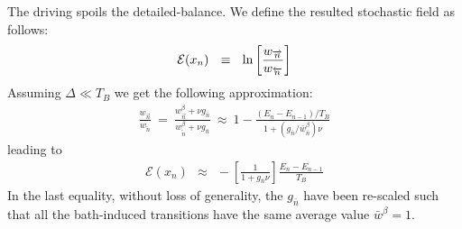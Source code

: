 \documentclass[aps,pre,floats,floatfix,twocolumn]{revtex4}
\newcommand{\mylabel}[1]{\label{#1}}
\newcommand{\beq}{\begin{eqnarray}}
\newcommand{\eeq}{\end{eqnarray}}
\newcommand{\be}[1]{\begin{eqnarray}\ifthenelse{#1=-1}
{\nonumber}{\ifthenelse{#1=0}{}{\mylabel{e#1}}}}
\begin{document}
The driving spoils the detailed-balance. 
We define the resulted stochastic field as follows:
%
\be{100} 
\mathcal{E}(x_n) \ \ \equiv \ \ \ln \left[\frac{w_{\overrightarrow{n}}}{w_{\overleftarrow{n}}}\right] 
\eeq
%
Assuming  ${\Delta \ll T_B}$ we get the following approximation: 
%
\beq
\frac{w_{\overrightarrow{n}}}{w_{\overleftarrow{n}}} 
\ = \ \frac{w^{\beta}_{\overrightarrow{n}}+\nu g_{\bar{n}}}{w^{\beta}_{\overleftarrow{n}}+\nu g_{\bar{n}}}
\ \approx \ 1- \frac{(E_n-E_{n{-}1})/T_B}{1+(g_{\bar{n}}/\bar{w}_{\bar{n}}^{\beta})\nu}
\eeq
%
leading to 
%
\beq
\mathcal{E}(x_n) \ \ \approx \ \ - \left[ \frac{1}{1+g_{\bar{n}}\nu} \right] \frac{E_n{-}E_{n{-}1}}{T_B}
\eeq
%
In the last equality, without loss of generality,  
the $g_{\bar{n}}$ have been re-scaled such that 
all the bath-induced transitions 
have the same average value ${\bar{w}^{\beta}=1}$.
\end{document}
